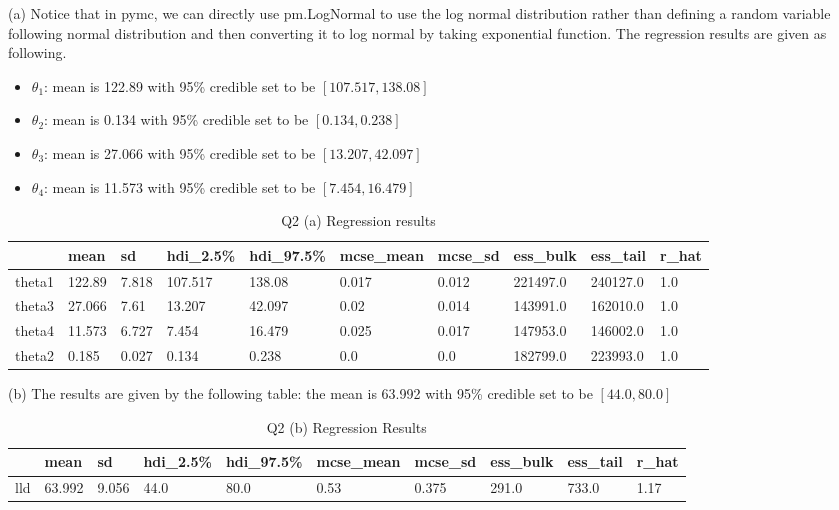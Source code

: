 \documentclass{homeworg}
\begin{document}
(a) Notice that in pymc, we can directly use pm.LogNormal to use the log normal distribution rather than defining a random variable following normal distribution and then converting it to log normal by taking exponential function. The regression results are given as following. 
\begin{itemize}
\item $\theta_1$: mean is 122.89 with 95\% credible set to be $[107.517,138.08]$
\item $\theta_2$: mean is 0.134 with 95\% credible set to be $[0.134,0.238]$
\item $\theta_3$: mean is 27.066 with 95\% credible set to be $[13.207, 42.097]$
\item $\theta_4$: mean is 11.573 with 95\% credible set to be $[7.454,16.479]$
\end{itemize}
\begin{table}[H]
	\caption{Q2 (a) Regression results}
	\begin{tabular}{llllllllll}
		\hline \hline
		& mean   & sd    & hdi\_2.5\% & hdi\_97.5\% & mcse\_mean & mcse\_sd & ess\_bulk & ess\_tail & r\_hat \\ \hline
		theta1 & 122.89 & 7.818 & 107.517    & 138.08      & 0.017      & 0.012    & 221497.0  & 240127.0  & 1.0    \\
		theta3 & 27.066 & 7.61  & 13.207     & 42.097      & 0.02       & 0.014    & 143991.0  & 162010.0  & 1.0    \\
		theta4 & 11.573 & 6.727 & 7.454      & 16.479      & 0.025      & 0.017    & 147953.0  & 146002.0  & 1.0    \\
		theta2 & 0.185  & 0.027 & 0.134      & 0.238       & 0.0        & 0.0      & 182799.0  & 223993.0  & 1.0   \\ \hline \hline
	\end{tabular}
\end{table}

(b) The results are given by the following table: the mean is 63.992 with 95\% credible set to be $[44.0,80.0]$
\begin{table}[H]
	\caption{Q2 (b) Regression Results}
	\begin{tabular}{llllllllll}
		\hline \hline
		& mean   & sd    & hdi\_2.5\% & hdi\_97.5\% & mcse\_mean & mcse\_sd & ess\_bulk & ess\_tail & r\_hat \\ \hline
		lld & 63.992 & 9.056 & 44.0       & 80.0        & 0.53       & 0.375    & 291.0     & 733.0     & 1.17  \\ \hline \hline
	\end{tabular}
\end{table}
\end{document}

